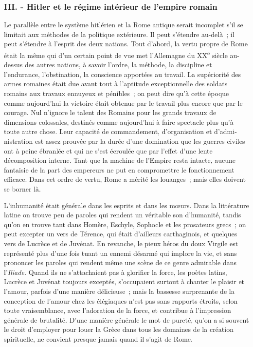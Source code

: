 \documentclass[french,twoside]{book} %
\begin{document}
\subsubsection[III. - Hitler et le régime intérieur de l'empire romain]{III. - Hitler et le régime intérieur de l'empire romain}
\noindent \par
Le parallèle entre le système hitlérien et la Rome antique serait incomplet s'il se limitait aux méthodes de la politique extérieure. Il peut s'étendre au-delà ; il peut s'étendre à l'esprit des deux nations. Tout d'abord, la vertu propre de Rome était la même qui d'un certain point de vue met l'Allemagne du XX\textsuperscript{e} siècle au-dessus des autres nations, à savoir l'ordre, la méthode, la discipline et l'endurance, l'obstination, la conscience apportées au travail. La supériorité des armes romaines était due avant tout à l'aptitude exceptionnelle des soldats romains aux travaux ennuyeux et pénibles ; on peut dire qu'à cette époque comme aujourd'hui la victoire était obtenue par le travail plus encore que par le courage. Nul n'ignore le talent des Romains pour les grands travaux de dimensions colossales, destinés comme aujourd'hui à faire spectacle plus qu'à toute autre chose. Leur capacité de commandement, d'organisation et d'admi­nistration est assez prouvée par la durée d'une domination que les guerres civiles ont à peine ébranlée et qui ne s'est écroulée que par l'effet d'une lente décomposition interne. Tant que la machine de l'Empire resta intacte, aucune fantaisie de la part des empereurs ne put en compromettre le fonctionnement efficace. Dans cet ordre de vertu, Rome a mérité les louanges ; mais elles doivent se borner là.\par
L'inhumanité était générale dans les esprits et dans les mœurs. Dans la littérature latine on trouve peu de paroles qui rendent un véritable son d'huma­nité, tandis qu'on en trouve tant dans Homère, Eschyle, Sophocle et les prosateurs grecs ; on peut excepter un vers de Térence, qui était d'ailleurs carthaginois, et quelques vers de Lucrèce et de Juvénat. En revanche, le pieux héros du doux Virgile est représenté plus d'une fois tuant un ennemi désarmé qui implore la vie, et sans prononcer les paroles qui rendent même une scène de ce genre admirable dans l'{\itshape Iliade.} Quand ils ne s'attachaient pas à glorifier la force, les poètes latins, Lucrèce et Juvénat toujours exceptés, s'occupaient surtout à chanter le plaisir et l'amour, parfois d'une manière délicieuse ; mais la bassesse surprenante de la conception de l'amour chez les élégiaques n'est pas sans rapports étroits, selon toute vraisemblance, avec l'adoration de la force, et contribue à l'impression générale de brutalité. D’une manière géné­rale le mot de pureté, qu'on a si souvent le droit d'employer pour louer la Grèce dans tous les domaines de la création spirituelle, ne convient presque jamais quand il s'agit de Rome.\par
\end{document}

